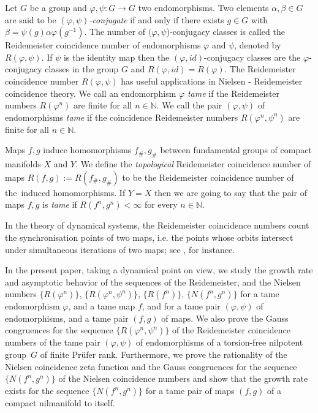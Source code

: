 \documentclass[12pt, a4paper]{amsart}
\def\N{{\mathbb N}}
\begin{document}
Let $G$ be a  group and $\varphi, \psi : G\rightarrow G$
two endomorphisms. Two elements $\alpha,\beta\in G$ are said to be $(\varphi, \psi)$\textit{-conjugate} if and only if there exists $g \in G$ with
$
\beta=\psi(g)  \alpha   \varphi(g^{-1}).
$
The number of $(\varphi,\psi$)-conjugacy classes is called the Reidemeister coincidence
number of   endomorphisms $\varphi $ and $\psi $, denoted by $ R(\varphi,\psi)$. If $\psi$ is the identity map then the $(\varphi,id)$-conjugacy classes are the $\varphi$-conjugacy classes in the group $G$ and $R(\varphi,id) = R(\varphi)$.
The Reidemeister coincidence number $R(\varphi,\psi)$ has useful applications in Nielsen - Reidemeister  coincidence theory.
We call an  endomorphism $\varphi$  \emph{tame} if the
Reidemeister numbers $R(\varphi^n)$ are finite for all $n \in
\mathbb{N}$.
We call the pair $(\varphi,\psi)$ of endomorphisms \emph{tame} if the coincidence
Reidemeister numbers $R(\varphi^n,\psi^n)$ are finite for all $n \in
\mathbb{N}$.

Maps $f,g$ induce homomorphisms $f_\#, g_\#$ between fundamental groups of compact manifolds $X$ and $Y$.
We define the \emph{topological} Reidemeister coincidence number of maps $R(f,g) := R(f_\#,g_\#)$
to be the Reidemeister coincidence number of the~induced homomorphisms.
If $Y=X$ then we are going to say that the pair of maps $f,g$ is \emph{tame} if
 $R(f^n, g^n) < \infty$ for every $n \in \N$.

In the theory of dynamical systems, the Reidemeister coincidence
numbers count the synchronisation points of two
maps, i.e. the points whose orbits intersect under simultaneous
iterations of two maps; see \cite{Mi13}, for instance.

In the present paper, taking a dynamical point on view, we study the growth rate
and asymptotic behavior of the sequences of the Reidemeister, and the Nielsen numbers
$\{R(\varphi^n)\}$, $\{R(\varphi^n,\psi^n)\}$, $\{R(f^n)\}$, $\{N(f^n, g^n)\}$
for a tame endomorphism $\varphi$, and a tame map $f$, and
for a tame pair $(\varphi,\psi)$ of endomorphisms, and a tame pair  $(f,g)$ of maps.
We also  prove the Gauss congruences for  the sequence $\{R(\varphi^n,\psi^n)\}$ of the
Reidemeister coincidence numbers of the tame pair $(\varphi,\psi)$ of endomorphisms of a
torsion-free nilpotent group~$G$ of finite Pr\"ufer rank.
Furthermore, we prove the rationality of the Nielsen coincidence zeta function and
the Gauss congruences for the sequence $\{N(f^n, g^n)\}$ of the Nielsen coincidence numbers
and show that the growth rate exists for the sequence $\{N(f^n, g^n)\}$
for a tame pair of maps $(f,g)$ of a compact nilmanifold to itself.
\end{document}
